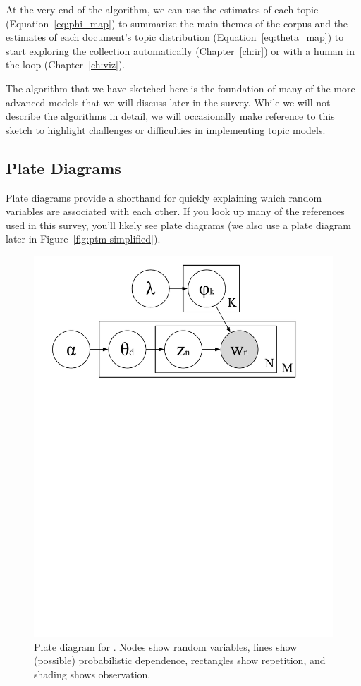 At the very end of the algorithm, we can use the estimates of each topic
(Equation~\ref{eq:phi_map}) to summarize the main themes of the corpus and the
estimates of each document's topic distribution (Equation~\ref{eq:theta_map}) to
start exploring the collection automatically (Chapter~\ref{ch:ir}) or with a
human in the loop (Chapter~\ref{ch:viz}).

The algorithm that we have sketched here is the foundation of many of the more
advanced models that we will discuss later in the survey.  While we will not describe
the algorithms in detail, we will occasionally make reference to this sketch to
highlight challenges or difficulties in implementing topic models.

\subsection{Plate Diagrams}
\label{sec:plate}

Plate diagrams provide a shorthand for quickly explaining which random
variables are associated with each other.  If you look up many of the
references used in this survey, you'll likely see plate diagrams (we
also use a plate diagram later in Figure~\ref{fig:ptm-simplified}).  

\begin{figure}
  \begin{center}
  \includegraphics[width=0.7\linewidth]{figures/lda_plate}
  \end{center}
  \caption{Plate diagram for .  Nodes show random variables,
    lines show (possible) probabilistic dependence, rectangles show
    repetition, and shading shows observation.}
  \label{fig:plate-lda}
\end{figure}

